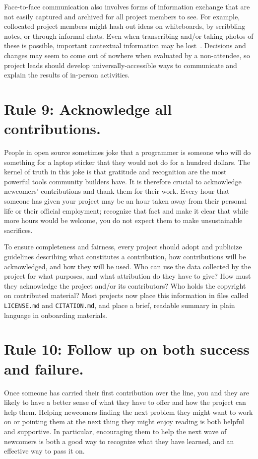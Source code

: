 \documentclass[10pt,letterpaper]{article}
\newcommand{\rulemajor}[1]{\section*{#1}}
\begin{document}
Face-to-face communication also involves forms of information exchange
that are not easily captured and archived for all project members to see.
For example,
collocated project members might hash out ideas on whiteboards,
by scribbling notes,
or through informal chats.
Even when transcribing and/or taking photos of these is possible,
important contextual information may be lost~\cite{cherubini2007}.
Decisions and changes may seem to come out of nowhere when evaluated by a non-attendee,
so project leads should develop universally-accessible ways to communicate and explain the results of in-person activities.

\rulemajor{Rule 9: Acknowledge all contributions.}

People in open source sometimes joke that
a programmer is someone who will do something for a laptop sticker
that they would not do for a hundred dollars.
The kernel of truth in this joke is that
gratitude and recognition are the most powerful tools community builders have.
It is therefore crucial to acknowledge newcomers' contributions and thank them for their work.
Every hour that someone has given your project may be an hour taken away from their personal life
or their official employment;
recognize that fact
and make it clear that while more hours would be welcome,
you do not expect them to make unsustainable sacrifices.

To ensure completeness and fairness,
every project should adopt and publicize guidelines describing
what constitutes a contribution,
how contributions will be acknowledged,
and how they will be used.
Who can use the data collected by the project for what purposes,
and what attribution do they have to give?
How must they acknowledge the project and/or its contributors?
Who holds the copyright on contributed material?
Most projects now place this information in files called \texttt{LICENSE.md} and \texttt{CITATION.md},
and place a brief, readable summary in plain language in onboarding materials.

\rulemajor{Rule 10: Follow up on both success and failure.}

Once someone has carried their first contribution over the line,
you and they are likely to have a better sense of what they have to offer
and how the project can help them.
Helping newcomers finding the next problem they might want to work on
or pointing them at the next thing they might enjoy reading
is both helpful and supportive.
In particular,
encouraging them to help the next wave of newcomers
is both a good way to recognize what they have learned,
and an effective way to pass it on.
\end{document}
